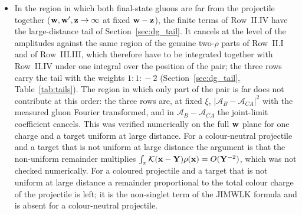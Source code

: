 \begin{itemize}
\item[(C10)] In the region in which both final-state gluons are far from the projectile together ($\mathbf{w},\mathbf{w}',\mathbf{z}\to\infty$ at fixed $\mathbf{w}-\mathbf{z}$), the finite terms of Row~II.IV have the large-distance tail of Section~\ref{sec:dg_tail}. It cancels at the level of the amplitudes against the same region of the genuine two-$\rho$ parts of Row~II.I and of Row~III.III, which therefore have to be integrated together with Row~II.IV under one integral over the position of the pair; the three rows carry the tail with the weights $1\!:\!1\!:\!-2$ (Section~\ref{sec:dg_tail}, Table~\ref{tab:tails}). The region in which only part of the pair is far does not contribute at this order: the three rows are, at fixed $\xi$, $|\mathcal A_B-\mathcal A_{CA}|^2$ with the measured gluon Fourier transformed, and in $\mathcal A_B-\mathcal A_{CA}$ the joint-limit coefficient cancels. This was verified numerically on the full $\mathbf{w}$ plane for one charge and a target uniform at large distance. For a colour-neutral projectile and a target that is not uniform at large distance the argument is that the non-uniform remainder multiplies $\int_x\mathcal{K}(\mathbf{x}-\mathbf{Y})\rho(\mathbf{x})=O(\mathbf{Y}^{-2})$, which was not checked numerically. For a coloured projectile and a target that is not uniform at large distance a remainder proportional to the total colour charge of the projectile is left; it is the non-singlet term of the JIMWLK formula and is absent for a colour-neutral projectile.
\end{itemize}

